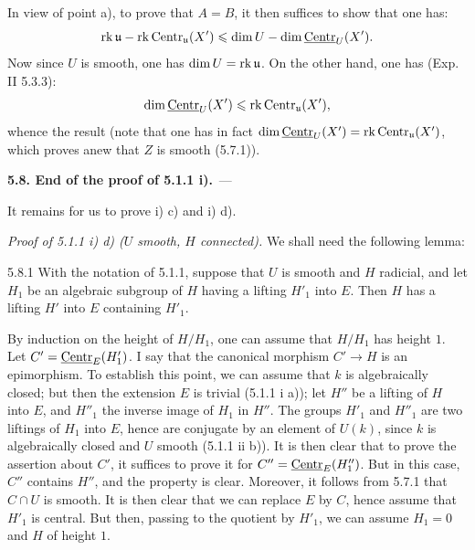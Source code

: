In view of point a), to prove that $A=B$, it then suffices to show that one has:
\[
 \operatorname{rk}\mathfrak u-\operatorname{rk}\operatorname{Centr}_{\mathfrak u}(X')
 \leqslant\dim U-\dim\underline{\mathrm{Centr}}_U(X').
\]
Now since $U$ is smooth, one has $\dim U=\operatorname{rk}\mathfrak u$. On the other hand, one has (Exp. II 5.3.3):
\[
 \dim\underline{\mathrm{Centr}}_U(X')\leqslant\operatorname{rk}\operatorname{Centr}_{\mathfrak u}(X'),
\]
whence the result (note that one has in fact $\dim\underline{\mathrm{Centr}}_U(X')=\operatorname{rk}\operatorname{Centr}_{\mathfrak u}(X')$, which proves anew that $Z$ is smooth (5.7.1)).

\par\medskip\noindent\textbf{5.8. End of the proof of 5.1.1 i).}\ ---\par\label{XVII.5.8}
It remains for us to prove i) c) and i) d).

\noindent\emph{Proof of 5.1.1 i) d) ($U$ smooth, $H$ connected).} We shall need the following lemma:
\begin{lemma}{5.8.1}\label{XVII.5.8.1}
With the notation of 5.1.1, suppose that $U$ is smooth and $H$ radicial, and let $H_1$ be an algebraic subgroup of $H$ having a lifting $H'_1$ into $E$. Then $H$ has a lifting $H'$ into $E$ containing $H'_1$.
\end{lemma}
By induction on the height of $H/H_1$, one can assume that $H/H_1$ has height $1$. Let $C'=\underline{\mathrm{Centr}}_E(H'_1)$. I say that the canonical morphism $C'\to H$ is an epimorphism. To establish this point, we can assume that $k$ is algebraically closed; but then the extension $E$ is trivial (5.1.1 i a)); let $H''$ be a lifting of $H$ into $E$, and $H''_1$ the inverse image of $H_1$ in $H''$. The groups $H'_1$ and $H''_1$ are two liftings of $H_1$ into $E$, hence are conjugate by an element of $U(k)$, since $k$ is algebraically closed and $U$ smooth (5.1.1 ii b)). It is then clear that to prove the assertion about $C'$, it suffices to prove it for $C''=\underline{\mathrm{Centr}}_E(H''_1)$. But in this case, $C''$ contains $H''$, and the property is clear. Moreover, it follows from 5.7.1 that $C\cap U$ is smooth. It is then clear that we can replace $E$ by $C$, hence assume that $H'_1$ is central. But then, passing to the quotient by $H'_1$, we can assume $H_1=0$ and $H$ of height $1$.

